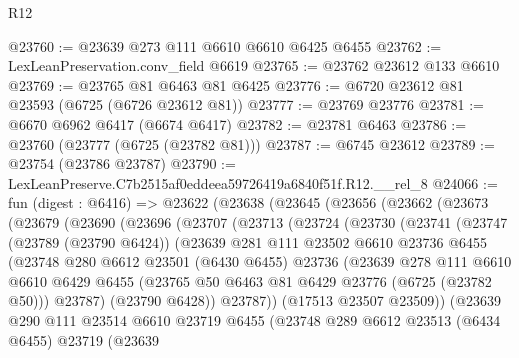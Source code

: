 \begin{lexlean}{R12}
\begin{coremodule}
@23760 := @23639 @273 @111 @6610 @6610 @6425 @6455
@23762 := LexLeanPreservation.conv_field @6619
@23765 := @23762 @23612 @133 @6610
@23769 := @23765 @81 @6463 @81 @6425
@23776 := @6720 @23612 @81 @23593 (@6725 (@6726 @23612 @81))
@23777 := @23769 @23776
@23781 := @6670 @6962 @6417 (@6674 @6417)
@23782 := @23781 @6463
@23786 := @23760 (@23777 (@6725 (@23782 @81)))
@23787 := @6745 @23612
@23789 := @23754 (@23786 @23787)
@23790 := LexLeanPreserve.C7b2515af0eddeea59726419a6840f51f.R12.__rel_8
@24066 := fun (digest : @6416) =>
  @23622
    (@23638
      (@23645
        (@23656
          (@23662
            (@23673
              (@23679
                (@23690
                  (@23696
                    (@23707
                      (@23713
                        (@23724
                          (@23730
                            (@23741
                              (@23747
                                (@23789 (@23790 @6424))
                                (@23639
                                  @281
                                  @111
                                  @23502
                                  @6610
                                  @23736
                                  @6455
                                  (@23748
                                    @280
                                    @6612
                                    @23501
                                    (@6430 @6455)
                                    @23736
                                    (@23639
                                      @278
                                      @111
                                      @6610
                                      @6610
                                      @6429
                                      @6455
                                      (@23765 @50 @6463 @81 @6429 @23776 (@6725 (@23782 @50)))
                                      @23787)
                                    (@23790 @6428))
                                  @23787))
                              (@17513 @23507 @23509))
                            (@23639
                              @290
                              @111
                              @23514
                              @6610
                              @23719
                              @6455
                              (@23748
                                @289
                                @6612
                                @23513
                                (@6434 @6455)
                                @23719
                                (@23639

\end{coremodule}
\end{lexlean}
